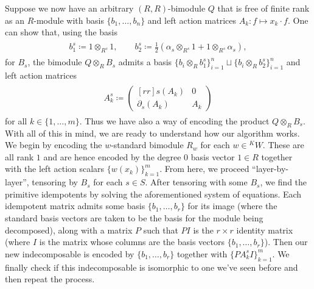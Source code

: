\noindent Suppose we now have an arbitrary $(R, R)$-bimodule $Q$ that is free of finite rank as an $R$-module with basis $\{b_1, \dots, b_n\}$ and left action matrices $A_k : f \mapsto x_k \cdot f$. One can show that, using the basis
\begin{align*}
\begin{split}
b_1^s \coloneqq 1 \otimes_{R^s} 1,\qquad b_2^s \coloneqq \frac{1}{2}(\alpha_s \otimes_{R^s} 1 + 1 \otimes_{R^s} \alpha_s),
\end{split}
\end{align*}
\noindent for $B_s$, the bimodule $Q \otimes_R B_s$ admits a basis $\{b_i \otimes_R b_1^s\}_{i=1}^n \sqcup \{b_i \otimes_R b_2^s\}_{i=1}^n$ and left action matrices
\begin{align*}
\begin{split}
A_k^s \coloneqq \begin{pmatrix}[rr]s(A_k) & 0\\\partial_s(A_k) & A_k\end{pmatrix}
\end{split}
\end{align*}
\noindent for all $k \in \{1, \dots, m\}$. Thus we have also a way of encoding the product $Q \otimes_R B_s$.\\

\noindent With all of this in mind, we are ready to understand how our algorithm works. We begin by encoding the $w$-standard bimodule $R_w$ for each $w \in {}^KW$. These are all rank $1$ and are hence encoded by the degree $0$ basis vector $1 \in R$ together with the left action scalars $\{w(x_k)\}_{k=1}^m$. From here, we proceed ``layer-by-layer'', tensoring by $B_s$ for each $s \in S$. After tensoring with some $B_s$, we find the primitive idempotents by solving the aforementioned system of equations. Each idempotent matrix admits some basis $\{b_1, \dots, b_r\}$ for its image (where the standard basis vectors are taken to be the basis for the module being decomposed), along with a matrix $P$ such that $PI$ is the $r \times r$ identity matrix (where $I$ is the matrix whose columns are the basis vectors $\{b_1, \dots, b_r\}$). Then our new indecomposable is encoded by $\{b_1, \dots, b_r\}$ together with $\{PA^s_kI\}_{k=1}^m$. We finally check if this indecomposable is isomorphic to one we've seen before and then repeat the process.\\

\newpage
\renewcommand\thesection{R}
\begingroup
\setlength{\emergencystretch}{.5em}
\printbibliography[heading=none]
\endgroup

